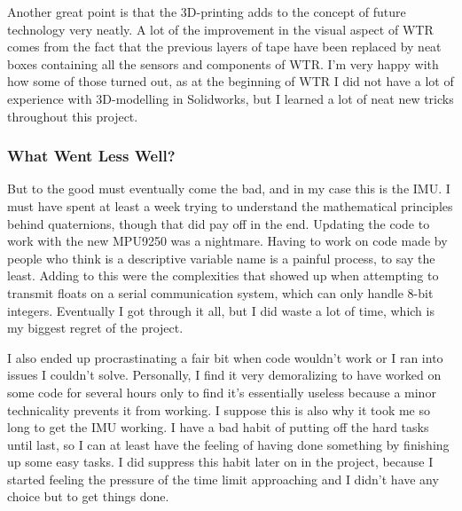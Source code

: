 Another great point is that the 3D-printing adds to the concept of future technology very neatly.
A lot of the improvement in the visual aspect of WTR comes from the fact that the previous layers of tape have been replaced by neat boxes containing all the sensors and components of WTR.
I'm very happy with how some of those turned out, as at the beginning of WTR I did not have a lot of experience with 3D-modelling in Solidworks, but I learned a lot of neat new tricks throughout this project.

\subsubsection{What Went Less Well?}
But to the good must eventually come the bad, and in my case this is the IMU.
I must have spent at least a week trying to understand the mathematical principles behind quaternions, though that did pay off in the end.
Updating the code to work with the new MPU9250 was a nightmare.
Having to work on code made by people who think  is a descriptive variable name is a painful process, to say the least.
Adding to this were the complexities that showed up when attempting to transmit floats on a serial communication system, which can only handle 8-bit integers.
Eventually I got through it all, but I did waste a lot of time, which is my biggest regret of the project.

I also ended up procrastinating a fair bit when code wouldn't work or I ran into issues I couldn't solve.
Personally, I find it very demoralizing to have worked on some code for several hours only to find it's essentially useless because a minor technicality prevents it from working.
I suppose this is also why it took me so long to get the IMU working.
I have a bad habit of putting off the hard tasks until last, so I can at least have the feeling of having done something by finishing up some easy tasks.
I did suppress this habit later on in the project, because I started feeling the pressure of the time limit approaching and I didn't have any choice but to get things done.

